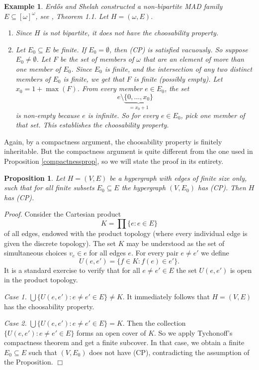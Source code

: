 \documentclass[12pt]{amsart}
\newtheorem{proposition}[lemma]{\bf Proposition}
\newtheorem{example}[lemma]{\bf Example}
\newcommand{\proofend}{{\hfill $\Box$}}
\begin{document}
\begin{example}{\em 
Erd\H{o}s and Shelah constructed a non-bipartite MAD family 
$E\subseteq [\omega]^\omega$, see
\cite{ES}, Theorem 1.1. Let $H = (\omega, E)$.
\begin{enumerate}
    \item Since $H$ is not bipartite, it does not have the choosability property.
    
    \item Let $E_0\subseteq E$ be finite. If $E_0 = \emptyset$, then
    (CP) is satisfied vacuously. So suppose $E_0 \neq \emptyset$. 
    Let $F$ be the set of members of $\omega$ that are
    an element of more than one member of $E_0$. Since $E_0$ is finite, and 
    the intersection of any two distinct members of $E_0$ is finite, 
    we get that $F$ is finite (possibly empty). Let $x_0 = 1 + \max(F)$.
    From every member $e\in E_0$, the set 
    $$e\setminus \underbrace{\{0,\ldots, x_0\}}_{= x_0+1}$$ is non-empty
    because $e$ is infinite. So for every $e\in E_0$, pick one member of
    that set. This establishes the choosability property.
\end{enumerate}
}
\end{example}
Again, by a compactness argument, the choosability property
is finitely inheritable. But the compactness argument is 
quite different from the one used in Proposition \ref{compactnessprop},
so we will state the proof in its entirety.
\begin{proposition}
Let $H= (V,E)$  be a hypergraph with edges of finite size only, such that for 
all finite subsets $E_0\subseteq E$ the hypergraph $(V, E_0)$ has (CP). 
Then $H$ has (CP).
\end{proposition}

{\em Proof.} Consider the Cartesian product $$K=\prod \{e: e\in E\}$$ of all edges, endowed
with the product topology (where every individual edge is given the discrete topology). 
The set $K$ may be understood as the set of simultaneous choices 
$v_e\in e$ for all edges $e$. For every pair $e\ne e'$ we define
$$U(e,e') = \{f\in K: f(e) \in e'\}.$$ It is a standard exercise to
verify that for all $e\neq e' \in E$ the set $U(e,e')$ is open in the
product topology. 

{\em Case 1.} $\bigcup\{U(e,e'): e\neq e'\in E\} \neq K$. It immediately follows
that $H = (V, E)$ has the choosability property.

{\em Case 2.} $\bigcup\{U(e,e'): e\neq e'\in E\} = K$. Then the collection
$\{U(e,e'): e\neq e'\in E\}$ forms an open cover of $K$. So we apply
Tychonoff's compactness theorem and get a finite subcover. In that case,
we obtain a finite $E_0\subseteq E$ such that $(V, E_0)$ does not
have (CP), contradicting the assumption of the Proposition.
\proofend
\end{document}
